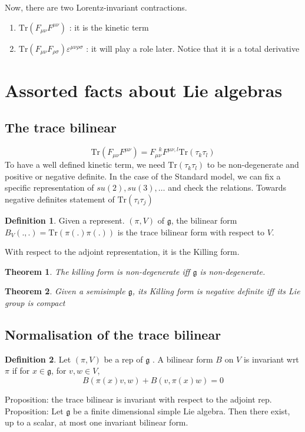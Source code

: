 \documentclass[a4paper]{book}
\newtheorem{theorem}{Theorem}[section]
\theoremstyle{definition}
\newtheorem{definition}{Definition}[section]
\theoremstyle{remark}
\begin{document}
Now, there are two Lorentz-invariant contractions. 
\begin{enumerate}
    \item $\text{Tr}(F_{\mu\nu}F^{\mu\nu})$ : it is the kinetic term
    \item $\text{Tr}(F_{\mu\nu}F_{\rho\sigma})\varepsilon^{\mu\nu\rho\sigma}$ : it will play a role later. Notice that it is a total derivative
\end{enumerate}

\section{Assorted facts about Lie algebras}
\subsection{The trace bilinear}

\begin{equation}
    \text{Tr}(F_{\mu\nu}F^{\mu\nu}) = F_{\mu\nu}^{~~~k}F^{\mu\nu,l}\text{Tr}(\tau_k\tau_l)
\end{equation}
To have a well defined kinetic term, we need $\text{Tr}(\tau_k\tau_l)$ to be non-degenerate and positive or negative definite. In the case of the Standard model, we can fix a specific representation of $su(2), su(3), \dots$ and check the relations. Towards negative definites statement of $\text{Tr}(\tau_i\tau_j)$ 
\begin{definition}
Given a represent. $(\pi, V)$ of $\mathfrak{g}$, the bilinear form $B_V(.,.) = \text{Tr}(\pi(.)\pi(.))$ is the trace bilinear form with respect to $V$. 
\end{definition}
With respect to the adjoint representation, it is the Killing form. 
\begin{theorem}
    The killing form is non-degenerate iff $\mathfrak g$ is non-degenerate. 
\end{theorem}
\begin{theorem}
    Given a semisimple $\mathfrak g$, its Killing form is negative definite iff its Lie group is compact
\end{theorem}

\subsection{Normalisation of the trace bilinear}
\begin{definition}
    Let $(\pi, V)$ be a rep of $\mathfrak g$ . A bilinear form $B$ on $V$ is invariant wrt $\pi$ if for $x\in \mathfrak g$, for $v,w\in V$, 
    \begin{equation}
        B(\pi(x)v, w) + B(v, \pi(x)w) = 0
    \end{equation}
\end{definition}
Proposition: the trace bilinear is invariant with respect to the adjoint rep. \newline 
Proposition: Let $\mathfrak g$ be a finite dimensional simple Lie algebra. Then there exist, up to a scalar, at most one invariant bilinear form. \par \medskip 
\end{document}
